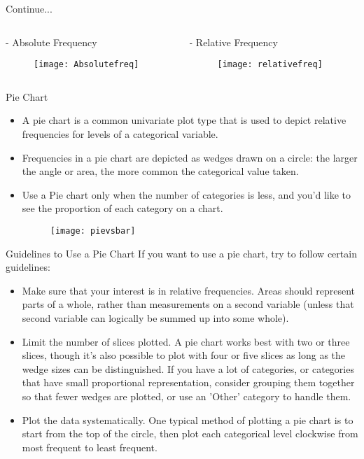 \documentclass[12pt]{beamer}
\begin{document}
    \begin{frame}{Continue...}
    	\begin{columns}
    		\begin{column}{0.5\textwidth}
    			- Absolute Frequency
    			\begin{figure}
    				\centering
    				\texttt{[image: Absolutefreq]}
    			\end{figure}
    		\end{column}
    	    \begin{column}{0.5\textwidth}
    	    	- Relative Frequency
    	    	\begin{figure}
    	    		\centering
    	    		\texttt{[image: relativefreq]}
    	    	\end{figure}
    	    \end{column}
    	\end{columns}
    \end{frame}
    \begin{frame}{Pie Chart}
    	\begin{itemize}
    		\item A pie chart is a common univariate plot type that is used to depict relative frequencies for levels of a categorical variable.
    		\item Frequencies in a pie chart are depicted as wedges drawn on a circle: the larger the angle or area, the more common the categorical value taken.
    		\item Use a Pie chart only when the number of categories is less, and you'd like to see the proportion of each category on a chart.
    		\begin{figure}
    			\centering
    			\texttt{[image: pievsbar]}
    		\end{figure}
    		
    	\end{itemize}
    \end{frame}
    \begin{frame}{Guidelines to Use a Pie Chart}
    	If you want to use a pie chart, try to follow certain guidelines:
    	\begin{itemize}
    		\item Make sure that your interest is in relative frequencies. Areas should represent parts of a whole, rather than measurements on a second variable (unless that second variable can logically be summed up into some whole).
    		\item Limit the number of slices plotted. A pie chart works best with two or three slices, though it's also possible to plot with four or five slices as long as the wedge sizes can be distinguished. If you have a lot of categories, or categories that have small proportional representation, consider grouping them together so that fewer wedges are plotted, or use an 'Other' category to handle them.
    		\item Plot the data systematically. One typical method of plotting a pie chart is to start from the top of the circle, then plot each categorical level clockwise from most frequent to least frequent.
    	\end{itemize}
    \end{frame}
\end{document}
